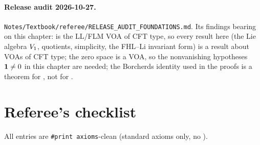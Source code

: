 \paragraph{Release audit 2026-10-27.} \texttt{Notes/\allowbreak Textbook/\allowbreak referee/\allowbreak RELEASE\_AUDIT\_FOUNDATIONS.md}.
Its findings bearing on this chapter:  is the LL/FLM VOA of CFT type, so every result here
(the Lie algebra $V_1$, quotients, simplicity, the FHL--Li invariant form) is a result about VOAs of CFT type; the
zero space is a VOA, so the nonvanishing hypotheses $\mathbf{1}\ne0$ in this chapter are needed; the Borcherds identity
used in the proofs is a theorem for , not for .

\section{Referee's checklist}\label{l04:sec:checklist}

All entries are \texttt{\#print axioms}-clean (standard axioms only, no ).

